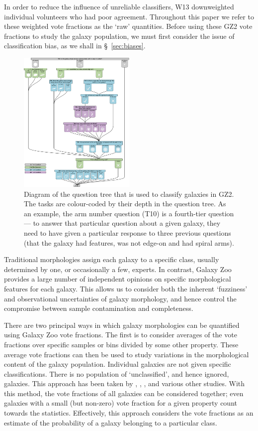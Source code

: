 \documentclass[useAMS,usenatbib]{mn2e}
\begin{document}
In order to reduce the influence of unreliable classifiers, W13 downweighted individual volunteers who had poor agreement.  Throughout this paper we refer to these weighted vote fractions as the `raw' quantities. Before using these GZ2 vote fractions to study the galaxy population, we must first consider the issue of classification bias, as we shall in \S~\ref{sec:biases}.

\begin{figure}
		\centering
		\includegraphics[width=0.5\textwidth]{Images/Data/gz2_tree_crop.pdf}
    \caption{Diagram of the question tree that is used to classify galaxies in GZ2. The tasks are colour-coded by their depth in the question tree. As an example, the arm number question (T10) is a fourth-tier question --- to answer that particular question about a given galaxy, they need to have given a particular response to three previous questions (that the galaxy had features, was not edge-on and had spiral arms).}
    \label{fig:question_tree}
\end{figure}

Traditional morphologies assign each galaxy to a specific class, usually determined by one, or occasionally a few, experts. In contrast, Galaxy Zoo provides a large number of independent opinions on specific morphological features for each galaxy.  This allows us to consider both the inherent `fuzziness' and observational uncertainties of galaxy morphology, and hence control the compromise between sample contamination and completeness.

There are two principal ways in which galaxy morphologies can be quantified using Galaxy Zoo vote fractions. The first is to consider averages of the vote fractions over specific samples or bins divided by some other property.  These average vote fractions can then be used to study variations in the morphological content of the galaxy population.  Individual galaxies are not given specific classifications.  There is no population of `unclassified', and hence ignored, galaxies.  This approach has been taken by \citet{Bamford_09}, \citet{Casteels_13}, \citet{Willett_15}, and various other studies. With this method, the vote fractions of all galaxies can be considered together; even galaxies with a small (but non-zero) vote fraction for a given property count towards the statistics. Effectively, this approach considers the vote fractions as an estimate of the probability of a galaxy belonging to a particular class.
\end{document}
